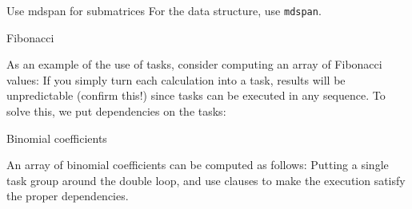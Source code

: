 \begin{cppnote}{Use mdspan for submatrices}
  For the data structure, use \lstinline{mdspan}.
\end{cppnote}

 {Fibonacci}

As an example of the use of tasks, consider computing an array of Fibonacci values:
%
%
If you simply turn each calculation into a task, results will be
unpredictable (confirm this!) since tasks can be executed in any sequence.
To solve this, we put dependencies on the tasks:
%

 {Binomial coefficients}

\begin{exercise}
  An array of binomial coefficients can be computed as follows:
  Putting a single task group around the double loop, and use
   clauses to make the execution satisfy the proper dependencies.
\end{exercise}


